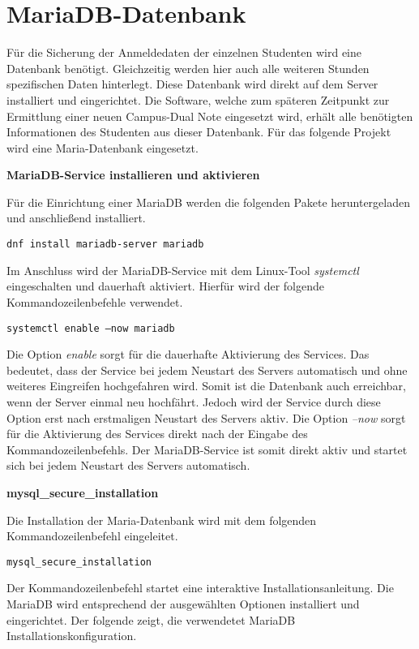 \section{MariaDB-Datenbank}
Für die Sicherung der Anmeldedaten der einzelnen Studenten wird eine Datenbank benötigt.
Gleichzeitig werden hier auch alle weiteren Stunden spezifischen Daten hinterlegt.
Diese Datenbank wird direkt auf dem Server installiert und eingerichtet.
Die Software, welche zum späteren Zeitpunkt zur Ermittlung einer neuen Campus-Dual Note eingesetzt wird, erhält alle benötigten Informationen des Studenten aus dieser Datenbank.
Für das folgende Projekt wird eine Maria-Datenbank eingesetzt.

\textbf{MariaDB-Service installieren und aktivieren}

Für die Einrichtung einer MariaDB werden die folgenden Pakete heruntergeladen und anschließend installiert.

\texttt{dnf install mariadb-server mariadb}

Im Anschluss wird der MariaDB-Service mit dem Linux-Tool \textit{systemctl} eingeschalten und dauerhaft aktiviert.
Hierfür wird der folgende Kommandozeilenbefehle verwendet.

\texttt{systemctl enable --now mariadb}

Die Option \textit{enable} sorgt für die dauerhafte Aktivierung des Services.
Das bedeutet, dass der Service bei jedem Neustart des Servers automatisch und ohne weiteres Eingreifen hochgefahren wird.
Somit ist die Datenbank auch erreichbar, wenn der Server einmal neu hochfährt.
Jedoch wird der Service durch diese Option erst nach erstmaligen Neustart des Servers aktiv.
Die Option \textit{--now} sorgt für die Aktivierung des Services direkt nach der Eingabe des Kommandozeilenbefehls.
Der MariaDB-Service ist somit direkt aktiv und startet sich bei jedem Neustart des Servers automatisch.
\newpage

\textbf{mysql\_secure\_installation}

Die Installation der Maria-Datenbank wird mit dem folgenden Kommandozeilenbefehl eingeleitet.

\texttt{mysql_secure_installation}

Der Kommandozeilenbefehl startet eine interaktive Installationsanleitung.
Die MariaDB wird entsprechend der ausgewählten Optionen installiert und eingerichtet.
Der folgende  zeigt, die verwendetet MariaDB Installationskonfiguration.


